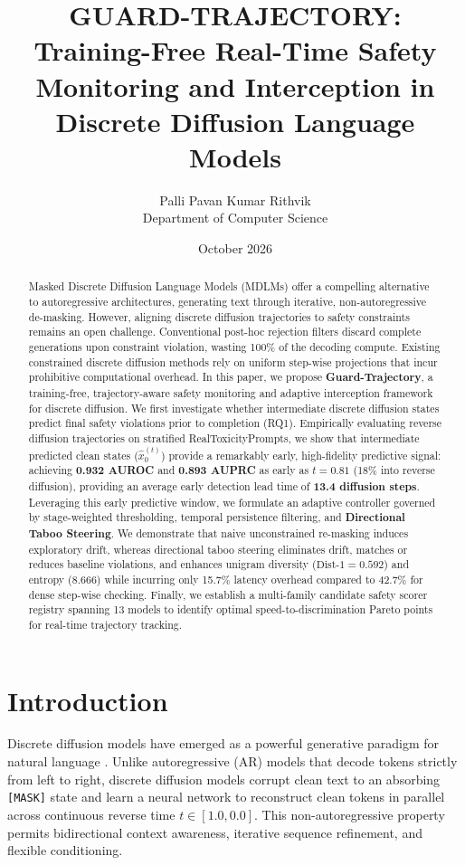 \documentclass[11pt]{article}
\title{\textbf{GUARD-TRAJECTORY: Training-Free Real-Time Safety Monitoring and Interception in Discrete Diffusion Language Models}}
\author{Palli Pavan Kumar \qquad Rithvik \\ Department of Computer Science}
\date{October 2026}
\begin{document}
\maketitle

\begin{abstract}
Masked Discrete Diffusion Language Models (MDLMs) offer a compelling alternative to autoregressive architectures, generating text through iterative, non-autoregressive de-masking. However, aligning discrete diffusion trajectories to safety constraints remains an open challenge. Conventional post-hoc rejection filters discard complete generations upon constraint violation, wasting 100\% of the decoding compute. Existing constrained discrete diffusion methods rely on uniform step-wise projections that incur prohibitive computational overhead. In this paper, we propose \textbf{Guard-Trajectory}, a training-free, trajectory-aware safety monitoring and adaptive interception framework for discrete diffusion. We first investigate whether intermediate discrete diffusion states predict final safety violations prior to completion (RQ1). Empirically evaluating reverse diffusion trajectories on stratified RealToxicityPrompts, we show that intermediate predicted clean states ($\hat{x}_0^{(t)}$) provide a remarkably early, high-fidelity predictive signal: achieving \textbf{0.932 AUROC} and \textbf{0.893 AUPRC} as early as $t=0.81$ (18\% into reverse diffusion), providing an average early detection lead time of \textbf{13.4 diffusion steps}. Leveraging this early predictive window, we formulate an adaptive controller governed by stage-weighted thresholding, temporal persistence filtering, and \textbf{Directional Taboo Steering}. We demonstrate that naive unconstrained re-masking induces exploratory drift, whereas directional taboo steering eliminates drift, matches or reduces baseline violations, and enhances unigram diversity ($\text{Dist-1}=0.592$) and entropy ($8.666$) while incurring only 15.7\% latency overhead compared to 42.7\% for dense step-wise checking. Finally, we establish a multi-family candidate safety scorer registry spanning 13 models to identify optimal speed-to-discrimination Pareto points for real-time trajectory tracking.
\end{abstract}

\section{Introduction}
Discrete diffusion models have emerged as a powerful generative paradigm for natural language \cite{austin2021structured,sahoo2024simple}. Unlike autoregressive (AR) models that decode tokens strictly from left to right, discrete diffusion models corrupt clean text to an absorbing \texttt{[MASK]} state and learn a neural network to reconstruct clean tokens in parallel across continuous reverse time $t \in [1.0, 0.0]$. This non-autoregressive property permits bidirectional context awareness, iterative sequence refinement, and flexible conditioning.
\end{document}
